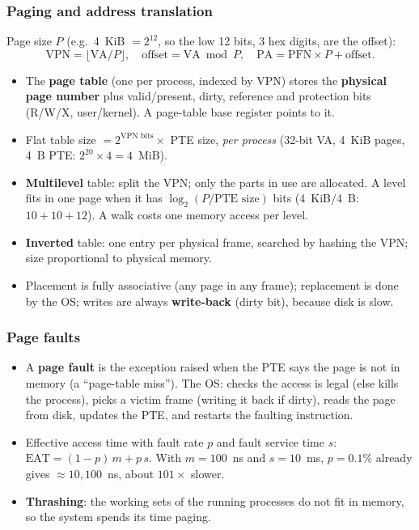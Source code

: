 \subsubsection{Paging and address translation}
Page size $P$ (e.g.\ 4~KiB $=2^{12}$, so the low 12 bits, 3 hex digits, are the
offset):
\[
  \text{VPN}=\lfloor\text{VA}/P\rfloor,\quad \text{offset}=\text{VA}\bmod P,\quad
  \text{PA}=\text{PFN}\times P+\text{offset}.
\]
\begin{itemize}[leftmargin=*]
  \item The \textbf{page table} (one per process, indexed by VPN) stores the
  \textbf{physical page number} plus valid/present, dirty, reference and protection
  bits (R/W/X, user/kernel). A page-table base register points to it.
  \item Flat table size $=2^{\text{VPN bits}}\times$ PTE size, \emph{per process}
  (32-bit VA, 4~KiB pages, 4~B PTE: $2^{20}\times4=4$~MiB).
  \item \textbf{Multilevel} table: split the VPN; only the parts in use are
  allocated. A level fits in one page when it has $\log_2(P/\text{PTE size})$ bits
  (4~KiB$/$4~B: $10+10+12$). A walk costs one memory access per level.
  \item \textbf{Inverted} table: one entry per physical frame, searched by hashing
  the VPN; size proportional to physical memory.
  \item Placement is fully associative (any page in any frame); replacement is done
  by the OS; writes are always \textbf{write-back} (dirty bit), because disk is slow.
\end{itemize}

\subsubsection{Page faults}
\begin{itemize}[leftmargin=*]
  \item A \textbf{page fault} is the exception raised when the PTE says the page is
  not in memory (a ``page-table miss''). The OS: checks the access is legal (else
  kills the process), picks a victim frame (writing it back if dirty), reads the page
  from disk, updates the PTE, and restarts the faulting instruction.
  \item Effective access time with fault rate $p$ and fault service time $s$:
  $\text{EAT}=(1-p)\,m+p\,s$. With $m=100$~ns and $s=10$~ms, $p=0.1\%$ already
  gives $\approx10{,}100$~ns, about $101\times$ slower.
  \item \textbf{Thrashing}: the working sets of the running processes do not fit in
  memory, so the system spends its time paging.
\end{itemize}

